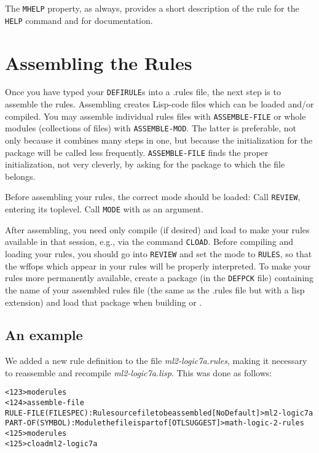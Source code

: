 The {\tt MHELP} property, as always, provides a short description of the rule
for the {\tt HELP} command and for documentation.


\section{Assembling the Rules}

Once you have typed your {\tt DEFIRULE}s into a .rules file, the next step
is to assemble the rules. Assembling creates Lisp-code files which can
be loaded and/or compiled. You may assemble individual rules files
with {\tt ASSEMBLE-FILE} or whole modules (collections of files) with
{\tt ASSEMBLE-MOD}. The latter is preferable, not only because
it combines many steps in one, but because the initialization for the package
will be called less frequently. {\tt ASSEMBLE-FILE}
finds the proper initialization, not very cleverly, by asking for the package
to which the file belongs.


Before assembling your rules, the correct mode should be loaded: Call {\tt REVIEW}, entering its toplevel.
Call {\tt MODE} with %
 {\tt {}}
as an argument.

After assembling, you need only compile (if desired) and load to make
your rules available in that session, e.g., via the command {\tt CLOAD}.
Before compiling and loading your rules, you should go into {\tt REVIEW} and
set the mode to {\tt RULES}, so that the wffops which appear in your
rules will be properly interpreted.
To make your rules more permanently
available, create a package (in the {\tt DEFPCK} file) containing
the name of your assembled rules file (the same as the .rules file
but with a lisp extension) and load that package when building {\TPS} or
{\ETPS}.

\subsection{An example}

We added a new rule definition to the file {\it ml2-logic7a.rules}, making it
necessary to reassemble and recompile {\it ml2-logic7a.lisp}. This was done
as follows:

\begin{alltt}
<123>mode rules
<124>assemble-file
RULE-FILE (FILESPEC): Rule source file to be assembled [No Default]>ml2-logic7a
PART-OF (SYMBOL): Module the file is part of [OTLSUGGEST]>math-logic-2-rules
<125>mode rules
<125>cload ml2-logic7a
\end{alltt}

